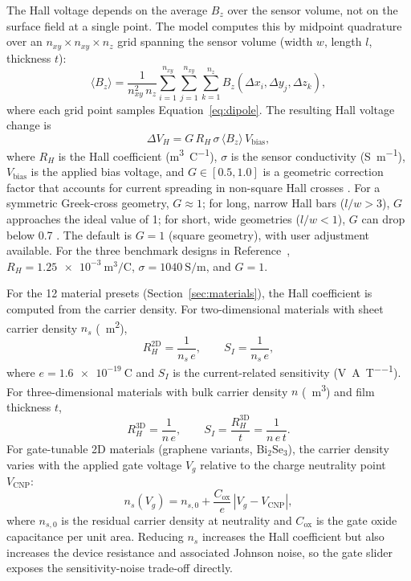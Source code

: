 \documentclass[micromachines,article,submit,pdftex,moreauthors]{Definitions/mdpi}
\begin{document}
The Hall voltage depends on the average $B_z$ over the sensor volume, not on the
surface field at a single point. The model computes this by midpoint quadrature
over an $n_{xy} \times n_{xy} \times n_z$ grid spanning the sensor volume (width
$w$, length $l$, thickness $t$):
\begin{equation}
\langle B_z \rangle = \frac{1}{n_{xy}^2 \, n_z}
\sum_{i=1}^{n_{xy}} \sum_{j=1}^{n_{xy}} \sum_{k=1}^{n_z}
B_z(\Delta x_i, \Delta y_j, \Delta z_k),
\label{eq:avgbz}
\end{equation}
where each grid point samples Equation~\eqref{eq:dipole}. The resulting Hall
voltage change is
\begin{equation}
\Delta V_H = G \, R_H \, \sigma \, \langle B_z \rangle \, V_{\text{bias}},
\label{eq:vh}
\end{equation}
where $R_H$ is the Hall coefficient (\si{\meter\cubed\per\coulomb}), $\sigma$ is the
sensor conductivity (\si{\siemens\per\meter}), $V_{\text{bias}}$ is the applied bias
voltage, and $G \in [0.5, 1.0]$ is a geometric correction factor that accounts for
current spreading in non-square Hall crosses \cite{popovic2004}. For a symmetric
Greek-cross geometry, $G \approx 1$; for long, narrow Hall bars ($l/w > 3$), $G$
approaches the ideal value of 1; for short, wide geometries ($l/w < 1$), $G$ can
drop below 0.7 \cite{popovic2004}. The default is $G = 1$ (square geometry), with
user adjustment available. For the three benchmark designs in
Reference~\cite{govindaraju2025}, $R_H = \SI{1.25e-3}{\meter\cubed\per\coulomb}$,
$\sigma = \SI{1040}{\siemens\per\meter}$, and $G = 1$.

For the 12 material presets (Section~\ref{sec:materials}), the Hall coefficient is
computed from the carrier density. For two-dimensional materials with sheet carrier
density $n_s$ (\si{\per\meter\squared}),
\begin{equation}
R_H^{\text{2D}} = \frac{1}{n_s \, e}, \qquad S_I = \frac{1}{n_s \, e},
\label{eq:rh2d}
\end{equation}
where $e = \SI{1.6e-19}{\coulomb}$ and $S_I$ is the current-related sensitivity
(\si{\volt\per\ampere\per\tesla}). For three-dimensional materials with bulk carrier
density $n$ (\si{\per\meter\cubed}) and film thickness $t$,
\begin{equation}
R_H^{\text{3D}} = \frac{1}{n \, e}, \qquad
S_I = \frac{R_H^{\text{3D}}}{t} = \frac{1}{n \, e \, t}.
\label{eq:rh3d}
\end{equation}
For gate-tunable 2D materials (graphene variants, Bi$_2$Se$_3$), the carrier density
varies with the applied gate voltage $V_g$ relative to the charge neutrality point
$V_{\text{CNP}}$:
\begin{equation}
n_s(V_g) = n_{s,0} + \frac{C_{\text{ox}}}{e}\,|V_g - V_{\text{CNP}}|,
\label{eq:gate}
\end{equation}
where $n_{s,0}$ is the residual carrier density at neutrality and $C_{\text{ox}}$ is
the gate oxide capacitance per unit area. Reducing $n_s$ increases the Hall
coefficient but also increases the device resistance and associated Johnson noise,
so the gate slider exposes the sensitivity-noise trade-off directly.
\end{document}
